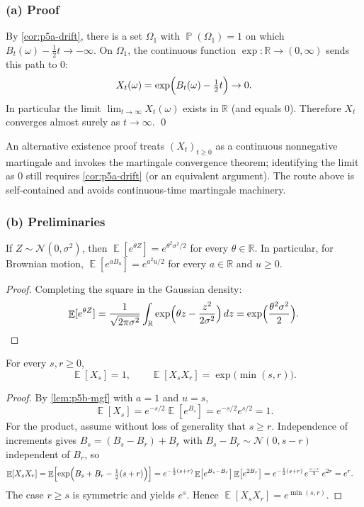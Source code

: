\documentclass[11pt,a4paper]{article}
\DeclareMathOperator{\E}{\mathbb{E}}
\DeclareMathOperator{\Pbb}{\mathbb{P}}
\begin{document}
\subsubsection{(a) Proof}

By \cref{cor:p5a-drift}, there is a set \(\Omega_1\) with \(\Pbb(\Omega_1)=1\) on which \(B_t(\omega)-\frac12 t\to-\infty\). On \(\Omega_1\), the continuous function \(\exp:\mathbb{R}\to(0,\infty)\) sends this path to \(0\):
\[
X_t(\omega)
=
\exp\Bigl(B_t(\omega)-\tfrac12 t\Bigr)
\to 0.
\]
In particular the limit \(\lim_{t\to\infty}X_t(\omega)\) exists in \(\mathbb{R}\) (and equals \(0\)). Therefore \(X_t\) converges almost surely as \(t\to\infty\).
\qed

\begin{remark*}
An alternative existence proof treats \((X_t)_{t\ge 0}\) as a continuous nonnegative martingale and invokes the martingale convergence theorem; identifying the limit as \(0\) still requires \cref{cor:p5a-drift} (or an equivalent argument). The route above is self-contained and avoids continuous-time martingale machinery.
\end{remark*}

\subsubsection{(b) Preliminaries}

\begin{lemma}
\label{lem:p5b-mgf}
If \(Z\sim\mathcal{N}(0,\sigma^2)\), then \(\E[e^{\theta Z}]=e^{\theta^2\sigma^2/2}\) for every \(\theta\in\mathbb{R}\). In particular, for Brownian motion, \(\E[e^{a B_u}]=e^{a^2 u/2}\) for every \(a\in\mathbb{R}\) and \(u\ge 0\).
\end{lemma}

\begin{proof}
Completing the square in the Gaussian density:
\[
\E[e^{\theta Z}]
=
\frac{1}{\sqrt{2\pi\sigma^2}}\int_{\mathbb{R}}
\exp\Bigl(\theta z-\frac{z^2}{2\sigma^2}\Bigr)\,dz
=
\exp\Bigl(\frac{\theta^2\sigma^2}{2}\Bigr).
\]
\end{proof}

\begin{lemma}
\label{lem:p5b-moments}
For every \(s,r\ge 0\),
\[
\E[X_s]=1,
\qquad
\E[X_s X_r]
=
\exp\bigl(\min(s,r)\bigr).
\]
\end{lemma}

\begin{proof}
By \cref{lem:p5b-mgf} with \(a=1\) and \(u=s\),
\[
\E[X_s]
=
e^{-s/2}\E[e^{B_s}]
=
e^{-s/2}e^{s/2}
=
1.
\]
For the product, assume without loss of generality that \(s\ge r\). Independence of increments gives \(B_s=(B_s-B_r)+B_r\) with \(B_s-B_r\sim\mathcal{N}(0,s-r)\) independent of \(B_r\), so
\begin{align*}
\E[X_s X_r]
&=
\E\Bigl[\exp\Bigl(B_s+B_r-\tfrac12(s+r)\Bigr)\Bigr]
=
e^{-\frac12(s+r)}
\E\bigl[e^{B_s-B_r}\bigr]
\E\bigl[e^{2B_r}\bigr]
=
e^{-\frac12(s+r)}\,e^{\frac{s-r}{2}}\,e^{2r}
=
e^{r}.
\end{align*}
The case \(r\ge s\) is symmetric and yields \(e^{s}\). Hence \(\E[X_s X_r]=e^{\min(s,r)}\).
\end{proof}
\end{document}
